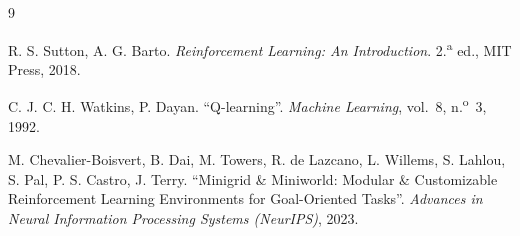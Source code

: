\documentclass[11pt,a4paper]{article}
\begin{document}
\clearpage
\begin{thebibliography}{9}

R. S. Sutton, A. G. Barto.
\emph{Reinforcement Learning: An Introduction}.
2.\textsuperscript{a} ed., MIT Press, 2018.

C. J. C. H. Watkins, P. Dayan.
``Q-learning''.
\emph{Machine Learning}, vol.~8, n.\textsuperscript{o}~3, 1992.

M. Chevalier-Boisvert, B. Dai, M. Towers, R. de Lazcano, L. Willems, S.
Lahlou, S. Pal, P. S. Castro, J. Terry.
``Minigrid \& Miniworld: Modular \& Customizable Reinforcement Learning
Environments for Goal-Oriented Tasks''.
\emph{Advances in Neural Information Processing Systems (NeurIPS)}, 2023.

\end{thebibliography}
\end{document}
